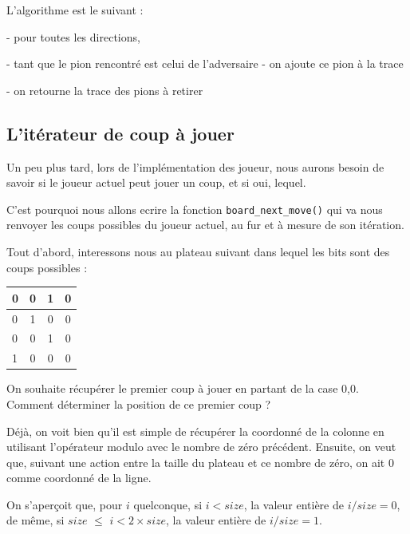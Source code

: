 \documentclass{report}
\begin{document}
L'algorithme est le suivant : \newline

- pour toutes les directions,

\tabto{1 cm}- tant que le pion rencontré est celui de l'adversaire
\tabto{1 cm}- on ajoute ce pion à la trace

- on retourne la trace des pions à retirer

\subsection{L'itérateur de coup à jouer}
Un peu plus tard, lors de l'implémentation des joueur, nous aurons besoin de savoir si le joueur actuel peut jouer un coup, et si oui, lequel.

C'est pourquoi nous allons ecrire la fonction \texttt{board\_next\_move()} qui va nous renvoyer les coups possibles du joueur actuel, au fur et à mesure de son itération.

Tout d'abord, interessons nous au plateau suivant dans lequel les bits sont des coups possibles :

\begin{center}
\renewcommand{\arraystretch} {1.5}
    \begin{tabular}{|p{0.2cm}|c|c|c|}
        \hline
        0 & 0 & 1 & 0\\
        \hline
        0 & 1 & 0 & 0 \\
        \hline
        0 & 0 & 1 & 0 \\
        \hline
        1 & 0 & 0 & 0 \\
        \hline
    \end{tabular}

\end{center}
\begin{center}
        \title{}
\end{center}

On souhaite récupérer le premier coup à jouer en partant de la case 0,0. Comment déterminer la position de ce premier coup ?

Déjà, on voit bien qu'il est simple de récupérer la coordonné de la colonne en utilisant l'opérateur modulo avec le nombre de zéro précédent. Ensuite, on veut que, suivant une action entre la taille du plateau et ce nombre de zéro, on ait 0 comme coordonné de la ligne.

On s'aperçoit que, pour $i$ quelconque, si $i<size$, la valeur entière de $i/size = 0$, de même, si $size$ $\le$ $i<2\times size$, la valeur entière de $i/size = 1$.
\end{document}

